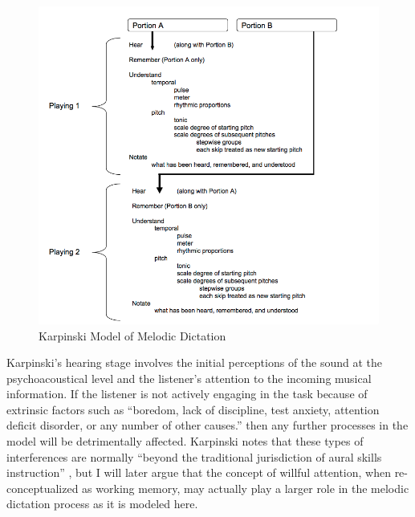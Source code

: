 \documentclass[12pt,]{book}
\begin{document}
\begin{figure}

{\centering \includegraphics[width=1\linewidth]{img/karpinski31} 

}

\caption{Karpinski Model of Melodic Dictation}\label{fig:flowchart}
\end{figure}

Karpinski's hearing stage involves the initial perceptions of the sound at the psychoacoustical level and the listener's attention to the incoming musical information.
If the listener is not actively engaging in the task because of extrinsic factors such as ``boredom, lack of discipline, test anxiety, attention deficit disorder, or any number of other causes.'' \citep[p.65]{karpinskiAuralSkillsAcquisition2000} then any further processes in the model will be detrimentally affected.
Karpinski notes that these types of interferences are normally ``beyond the traditional jurisdiction of aural skills instruction'' \citep[p.65]{karpinskiAuralSkillsAcquisition2000}, but I will later argue that the concept of willful attention, when re-conceptualized as working memory, may actually play a larger role in the melodic dictation process as it is modeled here.
\end{document}
